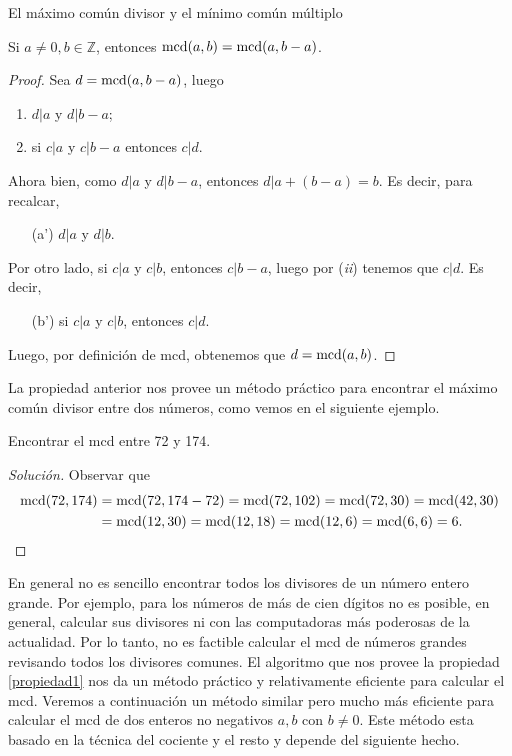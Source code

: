 \begin{section}{El máximo común divisor y el mínimo común
múltiplo}
\begin{propiedad}\label{propiedad1}
	Si $a \not=0, b \in \mathbb Z$, entonces $\operatorname{mcd}(a,b) = \operatorname{mcd}(a,b-a)$. 
\end{propiedad}
\begin{proof}
	Sea $d =  \operatorname{mcd}(a,b-a)$, luego 
	\begin{enumerate}[label=(\alph*)]
		\item $ d|a$ y $d|b -a$;
		\item si $ c|a $ y $c|b -a$ entonces $ c|d$.
	\end{enumerate}
	Ahora bien, como  $ d|a$ y $d|b -a$, entonces $  d|a +(b -a) = b$. Es decir, para recalcar,
	\begin{enumerate}
		\item[({a'})] $ d|a$ y $d|b$.
	\end{enumerate}
	Por otro lado, si  $ c|a $ y $c|b$, entonces  $c|b -a$, luego por ({\em ii}) tenemos que $c|d$. Es decir, 
	\begin{enumerate}
		\item[({b'})] si  $ c|a $ y $c|b$, entonces  $c|d$.
	\end{enumerate}
	Luego, por definición de mcd, obtenemos que $d = \operatorname{mcd}(a,b)$.
\end{proof}

La propiedad anterior nos provee un método práctico para encontrar el máximo común divisor entre dos números, como vemos en el siguiente ejemplo.

\begin{ejemplo} Encontrar el mcd entre 72 y 174.
	\begin{proof}[Solución] Observar que 
		\begin{align*}
		\operatorname{mcd}(72, 174) &= \operatorname{mcd}(72,174-72) = \operatorname{mcd}(72,102) = \operatorname{mcd}(72,30) =  \operatorname{mcd}(42, 30) \\&= \operatorname{mcd}(12,30) = \operatorname{mcd}(12,18)= \operatorname{mcd}(12,6)= \operatorname{mcd}(6,6) = 6.  
		\end{align*}
	\end{proof}
\end{ejemplo} 

En  general no es sencillo encontrar todos los divisores de un número entero grande. Por ejemplo, para los  números de más de cien dígitos no es posible,  en general, calcular sus divisores ni con las computadoras más poderosas de la actualidad. Por  lo tanto, no es factible calcular el  mcd de números grandes revisando todos los divisores comunes.  El algoritmo que nos provee la  propiedad \ref{propiedad1} nos da un método práctico y relativamente eficiente para calcular el mcd. Veremos a continuación un método similar pero mucho más eficiente para calcular el mcd de dos enteros no negativos $a,b$ con $b \not=0$. Este método esta basado en la técnica del cociente y el resto y depende del siguiente hecho.


\end{section}
